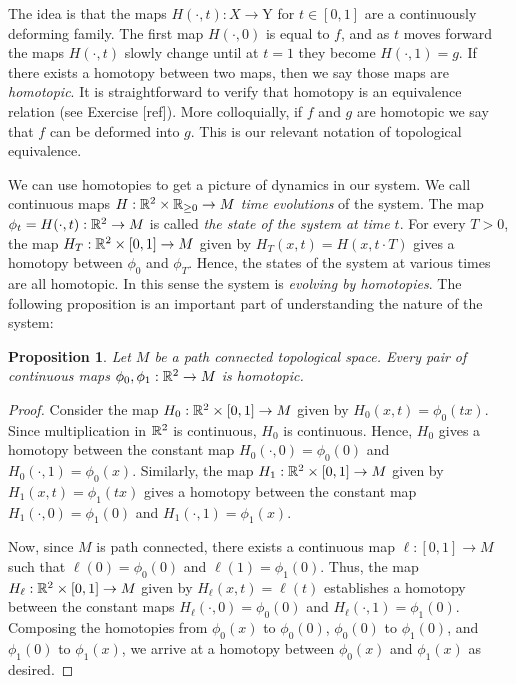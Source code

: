 \documentclass{article}
\newtheorem{proposition}{Proposition}[section]
\theoremstyle{definition}
\numberwithin{figure}{section}
\begin{document}
The idea is that the maps $H(\cdot,t):X\to $Y for $t\in [0,1]$ are a continuously deforming family. The first map $H(\cdot, 0)$ is equal to $f$, and as $t$ moves forward the maps $H(\cdot,t)$ slowly change until at $t=1$ they become $H(\cdot,1)=g$. If there exists a homotopy between two maps, then we say those maps are \textit{homotopic}. It is straightforward to verify that homotopy is an equivalence relation (see Exercise [ref]). More colloquially, if $f$ and $g$ are homotopic we say that $f$ can be deformed into $g$. This is our relevant notation of topological equivalence.

We can use homotopies to get a picture of dynamics in our system. We call continuous maps $H: \mathbb{R}^2 \times \mathbb{R}_{\geq 0}\to M$ \textit{time evolutions} of the system. The map $\phi_t=H(\cdot,t): \mathbb{R}^2\to M$ is called \textit{the state of the system at time $t$}. For every $T>0$, the map $H_T:\mathbb{R}^2\times [0,1]\to M$ given by $H_T(x,t)=H(x,t\cdot T)$ gives a homotopy between $\phi_0$ and $\phi_T$. Hence, the states of the system at various times are all homotopic. In this sense the system is \textit{evolving by homotopies}. The following proposition is an important part of understanding the nature of the system:

\begin{proposition}
Let $M$ be a path connected topological space. Every pair of continuous maps $\phi_0,\phi_1:\mathbb{R}^2\to M$ is homotopic.
\end{proposition}
\begin{proof}
Consider the map $H_0: \mathbb{R}^2\times [0,1]\to M$ given by $H_0(x,t)=\phi_0(tx)$. Since multiplication in $\mathbb{R}^2$ is continuous, $H_0$ is continuous. Hence, $H_0$ gives a homotopy between the constant map $H_0(\cdot,0)=\phi_0(0)$ and $H_0(\cdot,1)=\phi_0(x)$. Similarly, the map $H_1:\mathbb{R}^2\times [0,1]\to M$  given by $H_1(x,t)=\phi_1(tx)$ gives a homotopy between the constant map $H_1(\cdot,0)=\phi_1(0)$ and $H_1(\cdot,1)=\phi_1(x)$.

Now, since $M$ is path connected, there exists a continuous map $\ell: [0,1]\to M$ such that $\ell(0)=\phi_0(0)$ and $\ell(1)=\phi_1(0)$. Thus, the map $H_\ell:\mathbb{R}^2\times [0,1]\to M$ given by $H_\ell(x,t)=\ell(t)$ establishes a homotopy between the constant maps $H_\ell(\cdot,0)=\phi_0(0)$ and $H_\ell(\cdot,1)=\phi_1(0)$. Composing the homotopies from $\phi_0(x)$ to $\phi_0(0)$, $\phi_0(0)$ to $\phi_1(0)$, and $\phi_1(0)$ to $\phi_1(x)$, we arrive at a homotopy between $\phi_0(x)$ and $\phi_1(x)$ as desired.
\end{proof}
\end{document}
